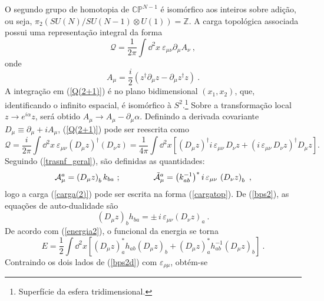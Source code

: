 O segundo grupo de homotopia de $\mathbb{CP}^{N-1}$ é isomórfico aos inteiros sobre adição, ou seja, $\pi_2\left(SU(N)/SU(N-1)\otimes U(1)\right) = \mathbb{Z}$. A carga topológica associada possui uma representação integral da forma
\begin{equation}
    \mathcal{Q} = \dfrac{1}{2\pi}\int \dd^2 x \ \varepsilon_{\mu \nu}\partial_\mu A_\nu \ ,
    \label{Q(2+1)}
\end{equation}
onde
\begin{equation}
    A_\mu = \dfrac{i}{2}\left(z^{\dag}\partial_\mu z - \partial_\mu z^{\dag} z\right) \ .
\end{equation}
A integração em (\ref{Q(2+1)}) é no plano bidimensional $(x_1 , x_2)$, que, identificando o infinito espacial, é isomórfico à $S^2$.\footnote{Superfície da esfera tridimensional.} Sobre a transformação local $z \rightarrow e^{i\alpha}z$, será obtido $A_\mu \rightarrow A_\mu -\partial_\mu \alpha$. Definindo a derivada covariante $D_\mu \equiv \partial_\mu + i A_\mu$, (\ref{Q(2+1)}) pode ser reescrita como
\begin{equation}
    \mathcal{Q} = \dfrac{i}{2\pi} \int \dd^2 x \ \varepsilon_{\mu\nu}\left(D_\mu z \right)^{\dag}\left(D_\nu z\right) = \dfrac{1}{4\pi} \int \dd^2 x \left[\left(D_\mu z \right)^{\dag} i \, \varepsilon_{\mu\nu} \, D_\nu z + \left( i \,  \varepsilon_{\mu\nu} \, D_\nu z\right)^{\dag} D_\mu z \right].
    \label{carga(2)}
\end{equation}
Seguindo (\ref{trasnf_geral}), são definidas as quantidades:
\begin{equation}
    \mathcal{A}^a_\mu = \left( D_\mu z\right)_b k_{ba} \ ; \qquad \qquad \Tilde{\mathcal{A}}_{\mu}^{a} = \left( k^{-1}_{ab} \right)^* i \, \varepsilon_{\mu\nu} \, \left(D_\nu z \right)_b \ , 
\end{equation}
logo a carga (\ref{carga(2)}) pode ser escrita na forma (\ref{cargatop}). De (\ref{bps2}), as equações de auto-dualidade são
\begin{equation}
    \left(D_\mu z\right)_b h_{ba} = \pm \, i \, \varepsilon_{\mu\nu} \left(D_\nu z\right )_a \ .
    \label{bps2d}
\end{equation}
De acordo com (\ref{energia2}), o funcional da energia se torna
\begin{equation}
    E = \dfrac{1}{2} \int \dd^2x \left[\left(D_\mu z\right)_a^* h_{ab} \left(D_\mu z\right)_b + \left(D_\mu z\right)_a^* h^{-1}_{ab} \left(D_\mu z\right)_b  \right] \ .
    \label{E2d}
\end{equation}
Contraindo os dois lados de (\ref{bps2d}) com $\varepsilon_{\rho \mu}$, obtém-se
